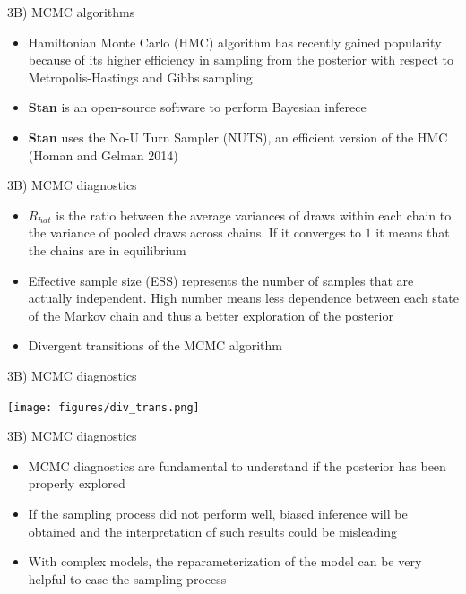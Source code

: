 \documentclass[ignorenonframetext,a4paper]{beamer}
\begin{document}
\begin{frame}{3B) MCMC algorithms}

\begin{itemize}
\item
  Hamiltonian Monte Carlo (HMC) algorithm has recently gained popularity
  because of its higher efficiency in sampling from the posterior with
  respect to Metropolis-Hastings and Gibbs sampling
\item
  \textbf{Stan} is an open-source software to perform Bayesian inferece
\item
  \textbf{Stan} uses the No-U Turn Sampler (NUTS), an efficient version
  of the HMC (Homan and Gelman 2014)
\end{itemize}

\end{frame}

\begin{frame}{3B) MCMC diagnostics}

\begin{itemize}
\setlength\itemsep{1em}
  \item{$R_{hat}$ is the ratio between the average variances of draws 
        within each chain to the variance of pooled draws across
        chains. If it converges to $1$ it means that the chains are
        in equilibrium}
  \item{Effective sample size (ESS) represents the number of samples
        that are actually independent. High number means less dependence
        between each state of the Markov chain and thus a better
        exploration of the posterior}
  \item{Divergent transitions of the MCMC algorithm}
\end{itemize}

\end{frame}

\begin{frame}{3B) MCMC diagnostics}

\texttt{[image: figures/div\_trans.png]}

\end{frame}

\begin{frame}{3B) MCMC diagnostics}

\begin{itemize}
\setlength\itemsep{1em}
  \item{MCMC diagnostics are fundamental to understand if the
        posterior has been properly explored}
  \item{If the sampling process did not perform well, biased inference
        will be obtained and the interpretation of such results
        could be misleading}
  \item{With complex models, the reparameterization of the model can be
        very helpful to ease the sampling process}
\end{itemize}

\end{frame}
\end{document}
